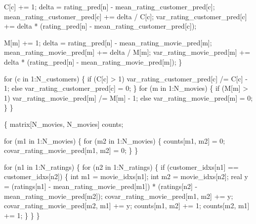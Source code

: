 \documentclass[
  letterpaper,
  DIV=11,
  numbers=noendperiod]{scrartcl}
\newenvironment{Shaded}{\begin{snugshade}}{\end{snugshade}}
\newcommand{\ControlFlowTok}[1]{\textcolor[rgb]{0.00,0.23,0.31}{#1}}
\newcommand{\DataTypeTok}[1]{\textcolor[rgb]{0.68,0.00,0.00}{#1}}
\newcommand{\DecValTok}[1]{\textcolor[rgb]{0.68,0.00,0.00}{#1}}
\newcommand{\NormalTok}[1]{\textcolor[rgb]{0.00,0.23,0.31}{#1}}
\begin{document}
\begin{codelisting}
\begin{Shaded}
\begin{Highlighting}[]
\NormalTok{      C[c] += }\DecValTok{1}\NormalTok{;}
\NormalTok{      delta = rating\_pred[n] {-} mean\_rating\_customer\_pred[c];}
\NormalTok{      mean\_rating\_customer\_pred[c] += delta / C[c];}
\NormalTok{      var\_rating\_customer\_pred[c]}
\NormalTok{        += delta * (rating\_pred[n] {-} mean\_rating\_customer\_pred[c]);}

\NormalTok{      M[m] += }\DecValTok{1}\NormalTok{;}
\NormalTok{      delta = rating\_pred[n] {-} mean\_rating\_movie\_pred[m];}
\NormalTok{      mean\_rating\_movie\_pred[m] += delta / M[m];}
\NormalTok{      var\_rating\_movie\_pred[m]}
\NormalTok{        += delta * (rating\_pred[n] {-} mean\_rating\_movie\_pred[m]);}
\NormalTok{    \}}

    \ControlFlowTok{for}\NormalTok{ (c }\ControlFlowTok{in} \DecValTok{1}\NormalTok{:N\_customers) \{}
      \ControlFlowTok{if}\NormalTok{ (C[c] \textgreater{} }\DecValTok{1}\NormalTok{)}
\NormalTok{        var\_rating\_customer\_pred[c] /= C[c] {-} }\DecValTok{1}\NormalTok{;}
      \ControlFlowTok{else}
\NormalTok{        var\_rating\_customer\_pred[c] = }\DecValTok{0}\NormalTok{;}
\NormalTok{    \}}
    \ControlFlowTok{for}\NormalTok{ (m }\ControlFlowTok{in} \DecValTok{1}\NormalTok{:N\_movies) \{}
      \ControlFlowTok{if}\NormalTok{ (M[m] \textgreater{} }\DecValTok{1}\NormalTok{)}
\NormalTok{        var\_rating\_movie\_pred[m] /= M[m] {-} }\DecValTok{1}\NormalTok{;}
      \ControlFlowTok{else}
\NormalTok{        var\_rating\_movie\_pred[m] = }\DecValTok{0}\NormalTok{;}
\NormalTok{    \}}
\NormalTok{  \}}

\NormalTok{  \{}
    \DataTypeTok{matrix}\NormalTok{[N\_movies, N\_movies] counts;}

    \ControlFlowTok{for}\NormalTok{ (m1 }\ControlFlowTok{in} \DecValTok{1}\NormalTok{:N\_movies) \{}
      \ControlFlowTok{for}\NormalTok{ (m2 }\ControlFlowTok{in} \DecValTok{1}\NormalTok{:N\_movies) \{}
\NormalTok{        counts[m1, m2] = }\DecValTok{0}\NormalTok{;}
\NormalTok{        covar\_rating\_movie\_pred[m1, m2] = }\DecValTok{0}\NormalTok{;}
\NormalTok{      \}}
\NormalTok{    \}}

    \ControlFlowTok{for}\NormalTok{ (n1 }\ControlFlowTok{in} \DecValTok{1}\NormalTok{:N\_ratings) \{}
      \ControlFlowTok{for}\NormalTok{ (n2 }\ControlFlowTok{in} \DecValTok{1}\NormalTok{:N\_ratings) \{}
        \ControlFlowTok{if}\NormalTok{ (customer\_idxs[n1] == customer\_idxs[n2]) \{}
          \DataTypeTok{int}\NormalTok{ m1 = movie\_idxs[n1];}
          \DataTypeTok{int}\NormalTok{ m2 = movie\_idxs[n2];}
          \DataTypeTok{real}\NormalTok{ y =   (ratings[n1] {-} mean\_rating\_movie\_pred[m1])}
\NormalTok{                   * (ratings[n2] {-} mean\_rating\_movie\_pred[m2]);}
\NormalTok{          covar\_rating\_movie\_pred[m1, m2] += y;}
\NormalTok{          covar\_rating\_movie\_pred[m2, m1] += y;}
\NormalTok{          counts[m1, m2] += }\DecValTok{1}\NormalTok{;}
\NormalTok{          counts[m2, m1] += }\DecValTok{1}\NormalTok{;}
\NormalTok{        \}}
\NormalTok{      \}}
\NormalTok{    \}}


\end{Highlighting}
\end{Shaded}
\end{codelisting}
\end{document}
